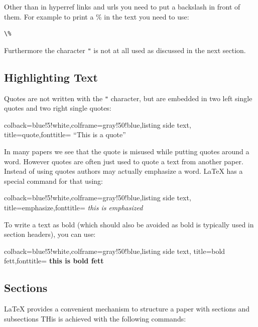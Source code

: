 Other than in hyperref links and urls you need to put a backslash in
front of them. For example to print a \% in the text you need to use:

\begin{verbatim}
\%
\end{verbatim}

Furthermore the character \verb|"| is not at all used as discussed in the next
section.

\subsection{Highlighting Text}\label{highlighting-text}

Quotes are not written with the \verb|"| character, but are embedded in two
left single quotes and two right single quotes:



\begin{tcblisting}{colback=blue!5!white,colframe=gray!50!blue,listing side text,
  title=quote,fonttitle=\bfseries}
``This is a quote''
\end{tcblisting}



In many papers we see that the quote is misused while putting quotes
around a word. However quotes are often just used to quote a text from
another paper. Instead of using quotes authors may actually emphasize a
word. LaTeX has a special command for that using:

\begin{tcblisting}{colback=blue!5!white,colframe=gray!50!blue,listing side text,
  title=emphasize,fonttitle=\bfseries}
\textit{this is emphasized}
\end{tcblisting}

To write a text as bold (which should also be avoided as bold is
typically used in section headers), you can use:

\begin{tcblisting}{colback=blue!5!white,colframe=gray!50!blue,listing side text,
  title=bold fett,fonttitle=\bfseries}
{\bf this is bold fett}
\end{tcblisting}

\subsection{Sections}\label{sections}

LaTeX provides a convenient mechanism to structure a paper with sections
and subsections THis is achieved with the following commands:

